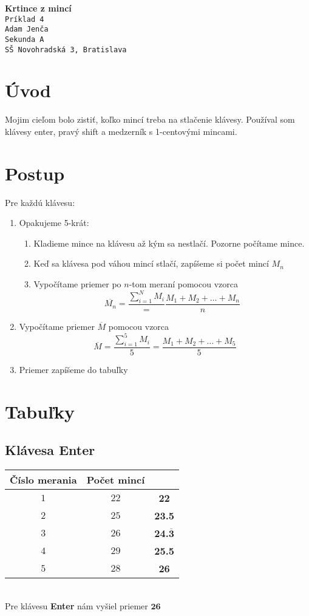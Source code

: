\documentclass{article}
\begin{document}
\begin{center}
	\huge \textbf{Krtince z mincí}\\
	\large \texttt{Príklad 4}\\
	\large \texttt{Adam Jenča}\\
	\large \texttt{Sekunda A}\\
	\large \texttt{SŠ Novohradská 3, Bratislava}\\
\end{center}
\section{Úvod}
Mojim cieľom bolo zistiť, koľko mincí treba na stlačenie klávesy. 
Používal som klávesy enter, pravý shift a medzerník s 1-centovými mincami.
\section{Postup}
Pre každú klávesu:
\begin{enumerate}
\item Opakujeme 5-krát:
\begin{enumerate}
\item Kladieme mince na klávesu až kým sa nestlačí. Pozorne počítame mince.
\item Keď sa klávesa pod váhou mincí stlačí, zapíšeme si počet mincí $M_n$
\item Vypočítame priemer po $n$-tom meraní pomocou vzorca
	\[
		\overline{M_n}=\frac{\displaystyle{\sum_{i=1}^N M_i}} = \frac{M_1+M_2+\dots+M_n}{n}
	\]
\end{enumerate}
\item Vypočítame priemer $\overline{M}$ pomocou vzorca 
	\[
		\overline{M}=\frac{\displaystyle{\sum_{i=1}^5 M_i}}{5}=\frac{M_1+M_2+\dots+M_5}{5} 
	\]
\item Priemer zapíšeme do tabuľky
\end{enumerate}
\section{Tabuľky}
\subsection{Klávesa Enter}
\begin{tabular}{|c|c|>{\bfseries}c|}
	\hline
	Číslo merania&Počet mincí&\normalfont{Priemer po $n$-tom meraní}\\
	\hline
	$1$&$22$&22\\
	\hline
	$2$&$25$&23.5\\
	\hline
	$3$&$26$& 24.$\bm {\overline{3}}$\\
	\hline
	$4$&$29$&25.5\\
	\hline
	$5$&$28$&26\\
	\hline
\end{tabular}\\
Pre klávesu \textbf{Enter} nám vyšiel priemer $\bm {26}$
\end{document}
